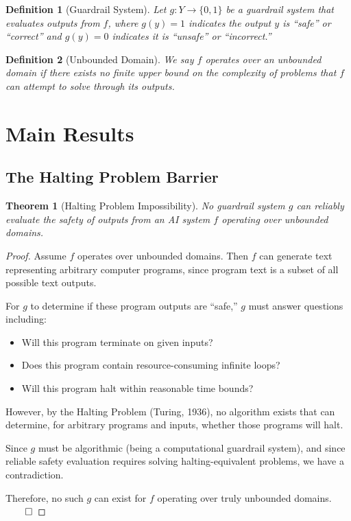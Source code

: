 \documentclass[11pt]{article}
\newtheorem{theorem}{Theorem}
\newtheorem{definition}{Definition}
\begin{document}
\begin{definition}[Guardrail System]
Let $g: Y \rightarrow \{0, 1\}$ be a guardrail system that evaluates outputs from $f$, where $g(y) = 1$ indicates the output $y$ is ``safe'' or ``correct'' and $g(y) = 0$ indicates it is ``unsafe'' or ``incorrect.''
\end{definition}

\begin{definition}[Unbounded Domain]
We say $f$ operates over an unbounded domain if there exists no finite upper bound on the complexity of problems that $f$ can attempt to solve through its outputs.
\end{definition}

\section{Main Results}

\subsection{The Halting Problem Barrier}

\begin{theorem}[Halting Problem Impossibility]
No guardrail system $g$ can reliably evaluate the safety of outputs from an AI system $f$ operating over unbounded domains.
\end{theorem}

\begin{proof}
Assume $f$ operates over unbounded domains. Then $f$ can generate text representing arbitrary computer programs, since program text is a subset of all possible text outputs.

For $g$ to determine if these program outputs are ``safe,'' $g$ must answer questions including:
\begin{itemize}
    \item Will this program terminate on given inputs?
    \item Does this program contain resource-consuming infinite loops?
    \item Will this program halt within reasonable time bounds?
\end{itemize}

However, by the Halting Problem (Turing, 1936), no algorithm exists that can determine, for arbitrary programs and inputs, whether those programs will halt.

Since $g$ must be algorithmic (being a computational guardrail system), and since reliable safety evaluation requires solving halting-equivalent problems, we have a contradiction.

Therefore, no such $g$ can exist for $f$ operating over truly unbounded domains. $\qed$
\end{proof}
\end{document}
